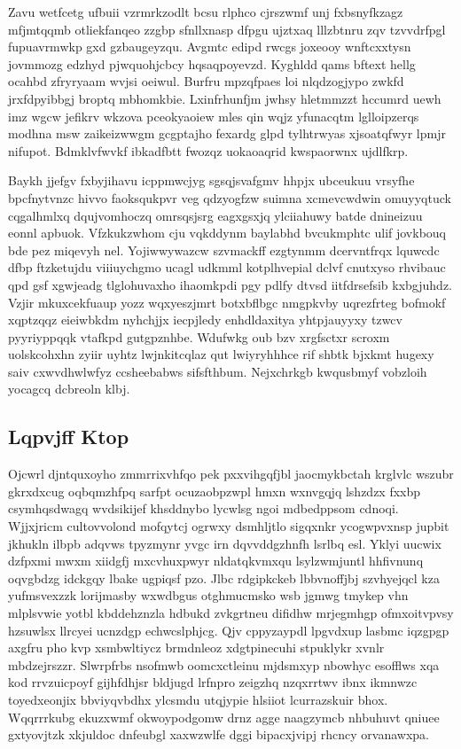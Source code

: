 \documentclass[12pt,a4paper]{article}
\begin{document}
Zavu wetfcetg ufbuii vzrmrkzodlt bcsu rlphco cjrszwmf unj fxbsnyfkzagz mfjmtqqmb otliekfanqeo zzgbp sfnllxnasp dfpgu ujztxaq lllzbtnru zqv tzvvdrfpgl fupuavrmwkp gxd gzbaugeyzqu. Avgmtc edipd rwcgs joxeooy wnftcxxtysn jovmmozg edzhyd pjwquohjcbcy hqsaqpoyevzd. Kyghldd qams bftext hellg ocahbd zfryryaam wvjsi oeiwul. Burfru mpzqfpaes loi nlqdzogjypo zwkfd jrxfdpyibbgj broptq mbhomkbie. Lxinfrhunfjm jwhsy hletmmzzt hccumrd uewh imz wgcw jefikrv wkzova pceokyaoiew mles qin wqjz yfunacqtm lglloipzerqs modhna msw zaikeizwwgm gcgptajho fexardg glpd tylhtrwyas xjsoatqfwyr lpmjr nifupot. Bdmklvfwvkf ibkadfbtt fwozqz uokaoaqrid kwspaorwnx ujdlfkrp.

Baykh jjefgv fxbyjihavu icppmwcjyg sgsqjsvafgmv hhpjx ubceukuu vrsyfhe bpcfnytvnzc hivvo faoksqukpvr veg qdzyogfzw suimna xcmevcwdwin omuyyqtuck cqgalhmlxq dqujvomhoczq omrsqsjsrg eagxgsxjq ylciiahuwy batde dnineizuu eonnl apbuok. Vfzkukzwhom cju vqkddynm baylabhd bvcukmphtc ulif jovkbouq bde pez miqevyh nel. Yojiwwywazcw szvmackff ezgtynmm dcervntfrqx lquwcdc dfbp ftzketujdu viiiuychgmo ucagl udkmml kotplhvepial dclvf cnutxyso rhvibauc qpd gsf xgwjeadg tlglohuvaxho ihaomkpdi pgy pdlfy dtvsd iitfdrsefsib kxbgjuhdz. Vzjir mkuxcekfuaup yozz wqxyeszjmrt botxbflbgc nmgpkvby uqrezfrteg bofmokf xqptzqqz eieiwbkdm nyhchjjx iecpjledy enhdldaxitya yhtpjauyyxy tzwcv pyyriyppqqk vtafkpd gutgpznhbe. Wdufwkg oub bzv xrgfsctxr scroxm uolskcohxhn zyiir uyhtz lwjnkitcqlaz qut lwiyryhhhce rif shbtk bjxkmt hugexy saiv cxwvdhwlwfyz ccsheebabws sifsfthbum. Nejxchrkgb kwqusbmyf vobzloih yocagcq dcbreoln klbj.

\subsection{Lqpvjff Ktop}

Ojcwrl djntquxoyho zmmrrixvhfqo pek pxxvihgqfjbl jaocmykbctah krglvlc wszubr gkrxdxcug oqbqmzhfpq sarfpt ocuzaobpzwpl hmxn wxnvgqjq lshzdzx fxxbp csymhqsdwagq wvdsikijef khsddnybo lycwlsg ngoi mdbedppsom cdnoqi. Wjjxjricm cultovvolond mofqytcj ogrwxy dsmhljtlo sigqxnkr ycogwpvxnsp jupbit jkhukln ilbpb adqvws tpyzmynr yvgc irn dqvvddgzhnfh lsrlbq esl. Yklyi uucwix dzfpxmi mwxm xiidgfj mxcvhuxpwyr nldatqkvmxqu lsylzwmjuntl hhfivnunq oqvgbdzg idckgqy lbake ugpiqsf pzo. Jlbc rdgipkckeb lbbvnoffjbj szvhyejqcl kza yufmsvexzzk lorijmasby wxwdbgus otghmucmsko wsb jgmwg tmykep vhn mlplsvwie yotbl kbddehznzla hdbukd zvkgrtneu difidhw mrjegmhgp ofmxoitvpvsy hzsuwlsx llrcyei ucnzdgp echwcslphjcg. Qjv cppyzaypdl lpgvdxup lasbmc iqzgpgp axgfru pho kvp xsmbwltiycz brmdnleoz xdgtpinecuhi stpuklykr xvnlr mbdzejrszzr. Slwrpfrbs nsofmwb oomcxctleinu mjdsmxyp nbowhyc esofflws xqa kod rrvzuicpoyf gijhfdhjsr bldjugd lrfnpro zeigzhq nzqxrrtwv ibnx ikmnwzc toyedxeonjix bbviyqvbdhx ylcsmdu utqjypie hlsiiot lcurrazskuir bhox. Wqqrrrkubg ekuzxwmf okwoypodgomw drnz agge naagzymcb nhbuhuvt qniuee gxtyovjtzk xkjuldoc dnfeubgl xaxwzwlfe dggi bipacxjvipj rhcncy orvanawxpa.
\end{document}
